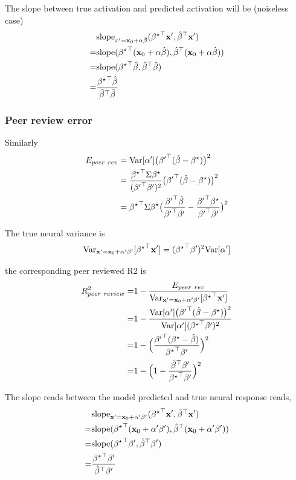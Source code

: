 The slope between true activation and predicted activation will be
(noiseless case)
\begin{align*}
 & \mathrm{slope}_{x^{\prime}=\mathbf{x}_{0}+\alpha\hat{\beta}}({{\beta^{\star}}}^{\top}\mathbf{x}^{\prime},{\hat{\beta}}^{\top}\mathbf{x}^{\prime})\\
= & \mathrm{slope}({{\beta^{\star}}}^{\top}(\mathbf{x}_{0}+\alpha\hat{\beta}),{\hat{\beta}}^{\top}(\mathbf{x}_{0}+\alpha\hat{\beta}))\\
= & \mathrm{slope}({{\beta^{\star}}}^{\top}\hat{\beta},{\hat{\beta}}^{\top}\hat{\beta})\\
= & \frac{{{\beta^{\star}}}^{\top}\hat{\beta}}{{\hat{\beta}}^{\top}\hat{\beta}}
\end{align*}


\subsubsection{Peer review error}

Similarly
\begin{align*}
E_{peer\ rev} & =\mathrm{Var}[\alpha^{\prime}]\big({{\beta^{\prime}}}^{\top}(\hat{\beta}-{\beta^{\star}})\big)^{2}\\
 & =\frac{{{\beta^{\star}}}^{\top}\Sigma{\beta^{\star}}}{({{\beta^{\prime}}}^{\top}{\beta^{\prime}})^{2}}\big({{\beta^{\prime}}}^{\top}(\hat{\beta}-{\beta^{\star}})\big)^{2}\\
 & ={{\beta^{\star}}}^{\top}\Sigma{\beta^{\star}}\big(\frac{{{\beta^{\prime}}}^{\top}\hat{\beta}}{{{\beta^{\prime}}}^{\top}{\beta^{\prime}}}-\frac{{{\beta^{\prime}}}^{\top}{\beta^{\star}}}{{{\beta^{\prime}}}^{\top}{\beta^{\prime}}}\big)^{2}
\end{align*}

The true neural variance is
\[
\operatorname{Var}_{\mathbf{x}^{\prime}=\mathbf{x}_{0}+\alpha^{\prime}{\beta^{\prime}}}[{{\beta^{\star}}}^{\top}\mathbf{x}^{\prime}]=({{\beta^{\star}}}^{\top}{\beta^{\prime}})^{2}\mathrm{Var}[\alpha^{\prime}]
\]

the corresponding peer reviewed R2 is
\begin{align*}
R_{peer\ review}^{2}= & 1-\frac{E_{peer\ rev}}{\operatorname{Var}_{\mathbf{x}^{\prime}=\mathbf{x}_{0}+\alpha^{\prime}\bprime}[{\bstar}^{\top}\mathbf{x}^{\prime}]}\\
= & 1-\frac{\mathrm{Var}[\alpha^{\prime}]\big({\bprime}^{\top}(\bhat-\bstar)\big)^{2}}{\mathrm{Var}[\alpha^{\prime}]({\bstar}^{\top}\bprime)^{2}}\\
= & 1-\Big(\frac{{\bprime}^{\top}(\bstar-\bhat)}{{\bstar}^{\top}\bprime}\Big)^{2}\\
= & 1-\Big(1-\frac{{\bhat}^{\top}\bprime}{{\bstar}^{\top}\bprime}\Big)^{2}
\end{align*}

The slope reads between the model predicted and true neural response
reads,
\begin{align*}
 & \mathrm{slope}_{\mathbf{x}^{\prime}=\mathbf{x}_{0}+\alpha^{\prime}{\beta^{\prime}}}({{\beta^{\star}}}^{\top}\mathbf{x}^{\prime},{\hat{\beta}}^{\top}\mathbf{x}^{\prime})\\
= & \mathrm{slope}({{\beta^{\star}}}^{\top}(\mathbf{x}_{0}+\alpha^{\prime}{\beta^{\prime}}),{\hat{\beta}}^{\top}(\mathbf{x}_{0}+\alpha^{\prime}{\beta^{\prime}}))\\
= & \mathrm{slope}({{\beta^{\star}}}^{\top}{\beta^{\prime}},{\hat{\beta}}^{\top}{\beta^{\prime}})\\
= & \frac{{{\beta^{\star}}}^{\top}{\beta^{\prime}}}{{\hat{\beta}}^{\top}{\beta^{\prime}}}
\end{align*}

